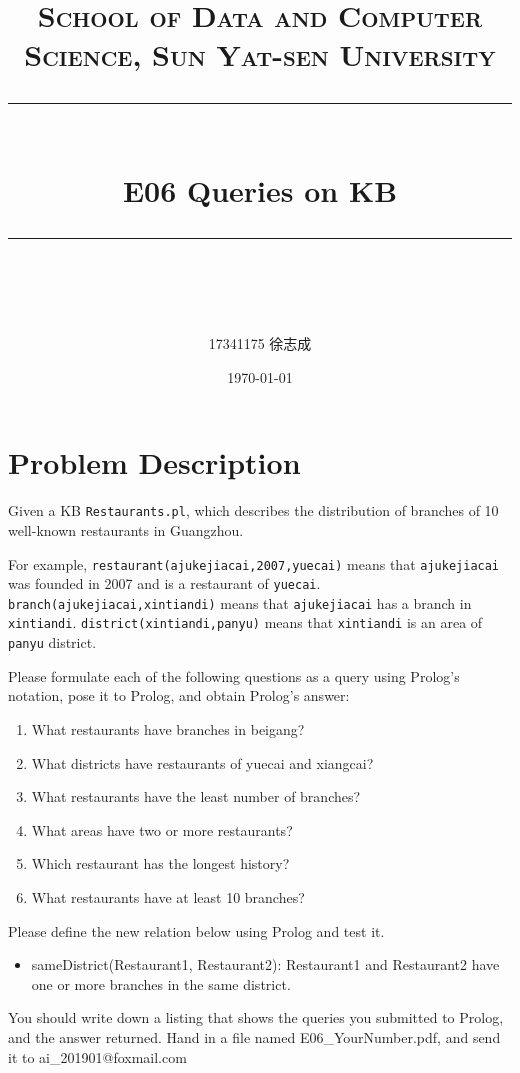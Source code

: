 ﻿\documentclass[a4paper, 11pt]{article}
\title{	
\normalfont \normalsize
\textsc{School of Data and Computer Science, Sun Yat-sen University} \\ [25pt] %
\rule{\textwidth}{0.5pt} \\[0.4cm] %
\huge  E06 Queries on KB \\ %
\rule{\textwidth}{2pt} \\[0.5cm] %
\author{17341175 徐志成}
\date{\normalsize\today}
}
\begin{document}
\maketitle
\tableofcontents
\newpage


\section{Problem Description}
Given a KB \texttt{Restaurants.pl}, which describes the distribution of branches of 10 well-known restaurants in Guangzhou. 

For example, \texttt{restaurant(ajukejiacai,2007,yuecai)} means that \texttt{ajukejiacai} was founded in 2007 and is a restaurant of \texttt{yuecai}. \texttt{branch(ajukejiacai,xintiandi)} means that \texttt{ajukejiacai} has a branch in \texttt{xintiandi}. \texttt{district(xintiandi,panyu)} means that \texttt{xintiandi} is an area of \texttt{panyu} district.

Please formulate each of the following questions as a query using Prolog's notation, pose it to Prolog, and obtain Prolog's answer:
\begin{enumerate}
  \item What restaurants have branches in beigang? 
  \item What districts have restaurants of yuecai and xiangcai?
  \item What restaurants have the least number of branches?
  \item What areas have two or more restaurants?
\item Which restaurant has the longest history?
\item What restaurants have at least 10 branches?
\end{enumerate}
Please define the new relation below using Prolog and test it.
\begin{itemize}
\item sameDistrict(Restaurant1, Restaurant2): Restaurant1 and Restaurant2 have one or more branches in the same district.
\end{itemize}




You should write down a listing that shows the queries you submitted to Prolog, and the answer returned. Hand in a file named \textsf{E06\_YourNumber.pdf}, and send it to \textsf{ai\_201901@foxmail.com}
\end{document}

